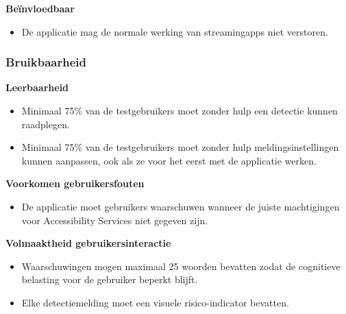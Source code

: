 \hspace*{1.5em}\textbf{Beïnvloedbaar}

\begin{itemize}
    \item De applicatie mag de normale werking van streamingapps niet verstoren.
\end{itemize}

\vspace{1em}

\subsubsection{Bruikbaarheid}
\vspace{1em}

\hspace*{1.5em}\textbf{Leerbaarheid}

\begin{itemize}
    \item Minimaal 75\% van de testgebruikers moet zonder hulp een detectie kunnen raadplegen.
    \item Minimaal 75\% van de testgebruikers moet zonder hulp meldingsinstellingen kunnen aanpassen, ook als ze voor het eerst met de applicatie werken.
\end{itemize}

\vspace{0.5em}

\hspace*{1.5em}\textbf{Voorkomen gebruikersfouten}

\begin{itemize}
    \item De applicatie moet gebruikers waarschuwen wanneer de juiste machtigingen voor Accessibility Services niet gegeven zijn.
\end{itemize}

\vspace{0.5em}

\hspace*{1.5em}\textbf{Volmaaktheid gebruikersinteractie}

\begin{itemize}
    \item Waarschuwingen mogen maximaal 25 woorden bevatten zodat de cognitieve belasting voor de gebruiker beperkt blijft.
    \item Elke detectiemelding moet een visuele risico-indicator bevatten.
\end{itemize}

\vspace{1em}

